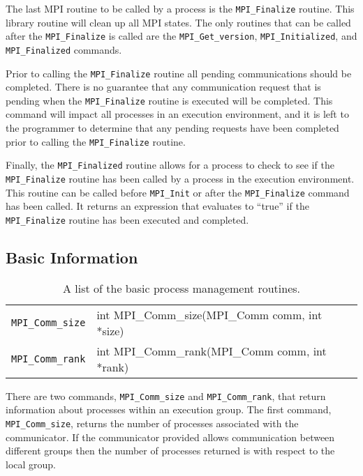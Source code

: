 The last MPI routine to be called by a process is the
\texttt{MPI\_Finalize} routine. This library routine will clean up all
MPI states. The only routines that can be called after the
\texttt{MPI\_Finalize} is called are the \texttt{MPI\_Get\_version},
\texttt{MPI\_Initialized}, and \texttt{MPI\_Finalized} commands.

Prior to calling the \texttt{MPI\_Finalize} routine all pending
communications should be completed. There is no guarantee that any
communication request that is pending when the \texttt{MPI\_Finalize}
routine is executed will be completed. This command will impact all
processes in an execution environment, and it is left to the
programmer to determine that any pending requests have been completed
prior to calling the \texttt{MPI\_Finalize} routine.

Finally, the \texttt{MPI\_Finalized} routine allows for a process to
check to see if the \texttt{MPI\_Finalize} routine has been called by
a process in the execution environment. This routine can be called
before \texttt{MPI\_Init} or after the \texttt{MPI\_Finalize} command
has been called. It returns an expression that evaluates to ``true''
if the \texttt{MPI\_Finalize} routine has been executed and
completed. 

\subsection{Basic Information}


\begin{table}
  \centering

  \begin{tabular}{ll}
    \texttt{MPI\_Comm\_size}  &  int MPI\_Comm\_size(MPI\_Comm comm, int *size)\\
    \texttt{MPI\_Comm\_rank}  &  int MPI\_Comm\_rank(MPI\_Comm comm, int *rank)\\
  \end{tabular}
\caption{A list of the basic process management routines.}
\label{tab:basicProcessInformation}
\end{table}

There are two commands, \texttt{MPI\_Comm\_size} and
\texttt{MPI\_Comm\_rank}, that return information about processes
within an execution group. The first command,
\texttt{MPI\_Comm\_size}, returns the number of processes associated
with the communicator. If the communicator provided allows
communication between different groups then the number of processes
returned is with respect to the local group. 

